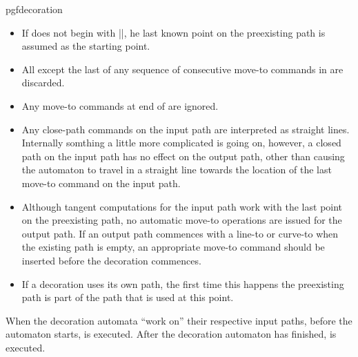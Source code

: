 \begin{environment}{{pgfdecoration}}
  \begin{itemize}
  \item
    If  does not begin with 
    |\pgfpathmoveto|,	he last known point on the preexisting path is 
    assumed as the starting point.
  \item
    All except the last of any sequence of consecutive move-to commands 
    in  are discarded.
  \item
    Any move-to commands at end of  are 
    ignored.
  \item
    Any close-path commands on the input path are interpreted as 
    straight lines.
    Internally somthing a little more complicated is going on,
    however, a closed path on the input path has no effect on the 
    output path, other than causing the automaton to travel in a 
    straight line towards the location of the last move-to command on 
    the input path.
  \item
    Although tangent computations for the input path work with the
    last point on the preexisting path, no automatic move-to
    operations are issued for the output path. 
    If an output path commences with a line-to or curve-to when the 
    existing path is empty, an appropriate move-to command should be 
    inserted before the decoration commences.
  \item
    If a decoration uses its own path, the first time this happens the
    preexisting path is part of the path that is used at this point.
  \end{itemize}

  When the decoration automata ``work on'' their respective input
  paths, before the automaton starts,  is
  executed. After the decoration automaton has finished,  is executed. 
        
\begin{codeexample}[]
\end{codeexample}


\end{environment}
